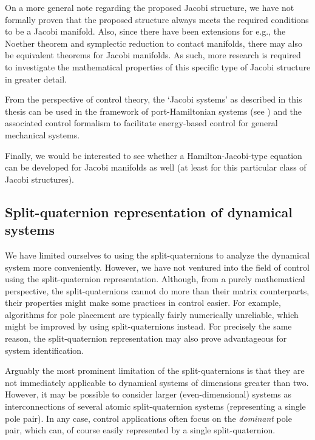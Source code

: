 On a more general note regarding the proposed Jacobi structure, we have not formally proven that the proposed structure always meets the required conditions to be a Jacobi manifold. Also, since there have been extensions for e.g., the Noether theorem and symplectic reduction to contact manifolds, there may also be equivalent theorems for Jacobi manifolds. As such, more research is required to investigate the mathematical properties of this specific type of Jacobi structure in greater detail.

From the perspective of control theory, the `Jacobi systems' as described in this thesis can be used in the framework of port-Hamiltonian systems (see \citet{VanDerSchaft2006}) and the associated control formalism to facilitate energy-based control for general mechanical systems.

Finally, we would be interested to see whether a Hamilton-Jacobi-type equation can be developed for Jacobi manifolds as well (at least for this particular class of Jacobi structures).

\subsection*{Split-quaternion representation of dynamical systems}
We have limited ourselves to using the split-quaternions to analyze the dynamical system more conveniently. However, we have not ventured into the field of control using the split-quaternion representation. Although, from a purely mathematical perspective, the split-quaternions cannot do more than their matrix counterparts, their properties might make some practices in control easier. For example, algorithms for pole placement are typically fairly numerically unreliable, which might be improved by using split-quaternions instead. For precisely the same reason, the split-quaternion representation may also prove advantageous for system identification.

Arguably the most prominent limitation of the split-quaternions is that they are not immediately applicable to dynamical systems of dimensions greater than two. However, it may be possible to consider larger (even-dimensional) systems as interconnections of several atomic split-quaternion systems (representing a single pole pair). In any case, control applications often focus on the \emph{dominant} pole pair, which can, of course easily represented by a single split-quaternion.


